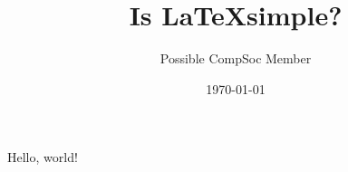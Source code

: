 \documentclass{article}
\title{Is \LaTeX simple?}
\date{\today}
\author{Possible CompSoc Member}
\begin{document}
    \maketitle
    \newpage

    Hello, world!
\end{document}
